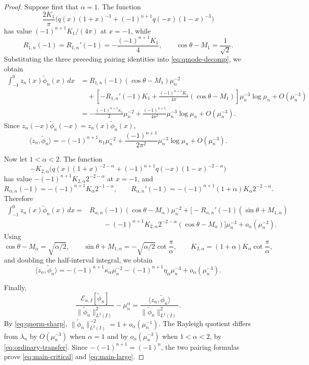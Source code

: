 \documentclass[11pt]{amsart}
\numberwithin{equation}{section}
\theoremstyle{remark}
\newcommand{\wt}{\widetilde}
\newcommand{\norm}[2][]{\lVert #2\rVert_{#1}}
\newcommand{\ip}[2]{\langle #1,#2\rangle}
\newcommand{\calE}{\mathcal E}
\begin{document}
\begin{proof}
Suppose first that $\alpha=1$.  The function
\[
 \frac{2K_1}{\pi}\bigl(q(x)(1+x)^{-3}+(-1)^{n+1} q(-x)(1-x)^{-3}\bigr)
\]
has value $(-1)^{n+1} K_1/(4\pi)$ at $x=-1$, while
\[
 R_{1,n}(-1)=R_{1,n}'(-1)=-\frac{(-1)^{n+1}K_1}{4},
 \qquad \cos\theta-M_1=\frac1{\sqrt2}.
\]
Substituting the three preceding pairing identities into \eqref{eq:qmode-decomp}, we obtain
\[
 \begin{aligned}
 \int_{-1}^0z_n(x)\wt\phi_n(x)\,dx
 &=R_{1,n}(-1)(\cos\theta-M_1)\mu_n^{-2}\\
 &\quad+\left[-R_{1,n}'(-1)K_1
 +\frac{(-1)^{n+1} K_1}{4\pi}(\cos\theta-M_1)\right]
 \mu_n^{-3}\log\mu_n+O(\mu_n^{-3})\\
 &=-\frac{(-1)^{n+1}\kappa_1}{2}\mu_n^{-2}
 +\frac{(-1)^{n+1}}{4\pi^2}\mu_n^{-3}\log\mu_n+O(\mu_n^{-3}).
 \end{aligned}
\]
Since $z_n(-x)\wt\phi_n(-x)=z_n(x)\wt\phi_n(x)$,
\[
 \ip{z_n}{\wt\phi_n}
 =-(-1)^{n+1}\kappa_1\mu_n^{-2}
 +\frac{(-1)^{n+1}}{2\pi^2}\mu_n^{-3}\log\mu_n+O(\mu_n^{-3}).
\]

Now let $1<\alpha<2$.  The function
\[
 -K_{2,\alpha}\bigl(q(x)(1+x)^{-2-\alpha}
 +(-1)^{n+1} q(-x)(1-x)^{-2-\alpha}\bigr)
\]
has value $-(-1)^{n+1} K_{2,\alpha}2^{-2-\alpha}$ at $x=-1$, and
\[
 R_{\alpha,n}(-1)=-(-1)^{n+1} K_\alpha2^{-1-\alpha},
 \qquad
 R_{\alpha,n}'(-1)=-(-1)^{n+1}(1+\alpha)K_\alpha2^{-2-\alpha}.
\]
Therefore
\[
 \begin{aligned}
 \int_{-1}^0z_n(x)\wt\phi_n(x)\,dx
 ={}&R_{\alpha,n}(-1)(\cos\theta-M_\alpha)\mu_n^{-2}+\bigl[-R_{\alpha,n}'(-1)(\sin\theta+M_{1,\alpha})\\
 &\qquad-(-1)^{n+1}K_{2,\alpha}2^{-2-\alpha}
 (\cos\theta-M_\alpha)\bigr]\mu_n^{-3}+o_\alpha(\mu_n^{-3}).
 \end{aligned}
\]
Using
\[
 \cos\theta-M_\alpha=\sqrt{\alpha/2},
 \qquad
 \sin\theta+M_{1,\alpha}=-\sqrt{\alpha/2}\cot\frac\pi\alpha,
 \qquad
 K_{2,\alpha}=(1+\alpha)K_\alpha\cot\frac\pi\alpha,
\]
and doubling the half-interval integral, we obtain
\[
 \ip{z_n}{\wt\phi_n}
 =-(-1)^{n+1}\kappa_\alpha\mu_n^{-2}
 -(-1)^{n+1}\eta_\alpha\mu_n^{-3}+o_\alpha(\mu_n^{-3}).
\]

Finally,
\[
 \frac{\calE_{\alpha,I}[\wt\phi_n]}{\norm[L^2(I)]{\wt\phi_n}^2}
 -\mu_n^\alpha
 =\frac{\ip{z_n}{\wt\phi_n}}{\norm[L^2(I)]{\wt\phi_n}^2}.
\]
By \eqref{eq:qnorm-sharp},
$\norm[L^2(I)]{\wt\phi_n}^{-2}=1+o_\alpha(\mu_n^{-1})$.  The
Rayleigh quotient differs from $\lambda_n$ by $O(\mu_n^{-3})$ when
$\alpha=1$ and by $o_\alpha(\mu_n^{-3})$ when $1<\alpha<2$, by
\eqref{eq:ordinary-transfer}.  Since $-(-1)^{n+1}=(-1)^n$, the two pairing
formulas prove \eqref{eq:main-critical} and \eqref{eq:main-large}.
\end{proof}
\end{document}
